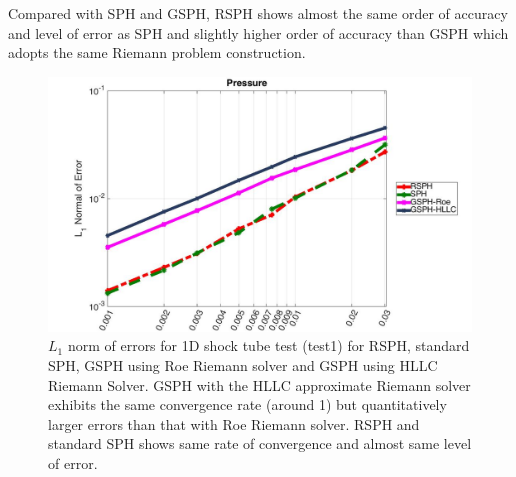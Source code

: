 \documentclass[preprint,12pt,authoryear]{elsarticle}
\begin{document}
 Compared with SPH and GSPH, RSPH shows almost the same order of accuracy and level of error as SPH and slightly higher order of accuracy than GSPH which adopts the same Riemann problem construction.
 
\begin{figure}[H]
    \centering
    \begin{minipage}{.70\textwidth}
        \centering
        \includegraphics[width=0.99 \textwidth]{./Figures/Accuracy-pre}
    \end{minipage}%
    \caption{ $L_1$ norm of errors for 1D shock tube test (test1) for RSPH, standard SPH, GSPH using Roe Riemann solver and GSPH using HLLC Riemann Solver. GSPH with the HLLC approximate Riemann solver exhibits the same convergence rate (around 1) but quantitatively larger errors than that with Roe Riemann solver. RSPH and standard SPH shows same rate of convergence and almost same level of error.}
    \label{fig:Accuracy-test1}
\end{figure}
 
\end{document}
